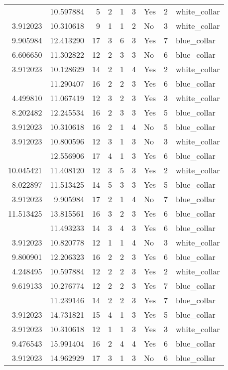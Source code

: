 \documentclass[
]{article}
\begin{document}
\begin{longtable}[t]{rrrrrllrl}
\addlinespace
3.912023 & 10.597884 & 5 & 2 & 1 & 3 & Yes & 2 & white\_collar\\
3.912023 & 10.310618 & 9 & 1 & 1 & 2 & No & 3 & white\_collar\\
9.905984 & 12.413290 & 17 & 3 & 6 & 3 & Yes & 7 & blue\_collar\\
6.606650 & 11.302822 & 12 & 2 & 3 & 3 & No & 6 & blue\_collar\\
3.912023 & 10.128629 & 14 & 2 & 1 & 4 & Yes & 2 & white\_collar\\
\addlinespace
8.086410 & 11.290407 & 16 & 2 & 2 & 3 & Yes & 6 & blue\_collar\\
4.499810 & 11.067419 & 12 & 3 & 2 & 3 & Yes & 3 & white\_collar\\
8.202482 & 12.245534 & 16 & 2 & 3 & 3 & Yes & 5 & blue\_collar\\
3.912023 & 10.310618 & 16 & 2 & 1 & 4 & No & 5 & blue\_collar\\
3.912023 & 10.800596 & 12 & 3 & 1 & 3 & No & 3 & white\_collar\\
\addlinespace
3.912023 & 12.556906 & 17 & 4 & 1 & 3 & Yes & 6 & blue\_collar\\
10.045421 & 11.408120 & 12 & 3 & 5 & 3 & Yes & 2 & white\_collar\\
8.022897 & 11.513425 & 14 & 5 & 3 & 3 & Yes & 5 & blue\_collar\\
3.912023 & 9.905984 & 17 & 2 & 1 & 4 & No & 7 & blue\_collar\\
11.513425 & 13.815561 & 16 & 3 & 2 & 3 & Yes & 6 & blue\_collar\\
\addlinespace
11.408120 & 11.493233 & 14 & 3 & 4 & 3 & Yes & 6 & blue\_collar\\
3.912023 & 10.820778 & 12 & 1 & 1 & 4 & No & 3 & white\_collar\\
9.800901 & 12.206323 & 16 & 2 & 2 & 3 & Yes & 6 & blue\_collar\\
4.248495 & 10.597884 & 12 & 2 & 2 & 3 & Yes & 2 & white\_collar\\
9.619133 & 10.276774 & 12 & 2 & 2 & 3 & Yes & 7 & blue\_collar\\
\addlinespace
6.476972 & 11.239146 & 14 & 2 & 2 & 3 & Yes & 7 & blue\_collar\\
3.912023 & 14.731821 & 15 & 4 & 1 & 3 & Yes & 5 & blue\_collar\\
3.912023 & 10.310618 & 12 & 1 & 1 & 3 & Yes & 3 & white\_collar\\
9.476543 & 15.991404 & 16 & 2 & 4 & 4 & Yes & 6 & blue\_collar\\
3.912023 & 14.962929 & 17 & 3 & 1 & 3 & No & 6 & blue\_collar\\

\end{longtable}
\end{document}
